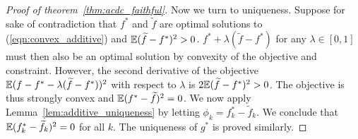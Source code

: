\begin{proof}[Proof of theorem~\ref{thm:acdc_faithful}]
Now we turn to uniqueness. Suppose for sake of contradiction that $f^*$ and $\tilde{f}$ are optimal solutions to (\ref{eqn:convex_additive}) and ${\mathbb E} (\widetilde{f} - f^*)^2 > 0$.  $f^* + \lambda ( \tilde{f}  - f^*)$ for any $\lambda \in [0,1]$ must then also be an optimal solution by convexity of the objective and constraint. However, the second derivative of the objective ${\mathbb E}( f - f^* - \lambda(\widetilde{f} - f^*))^2$ with respect to $\lambda$ is $2 {\mathbb E}( \widetilde{f} - f^*)^2 > 0$. The objective is thus strongly convex and ${\mathbb E}(f^* - \widetilde{f})^2 = 0$. We now apply Lemma~\ref{lem:additive_uniqueness} by letting $\phi_k = f^*_k - \tilde{f}_k$. We conclude that ${\mathbb E} (f^*_k - \widetilde{f}_k)^2 = 0$ for all $k$. The uniqueness of $g^*$ is proved similarly.
\end{proof}










